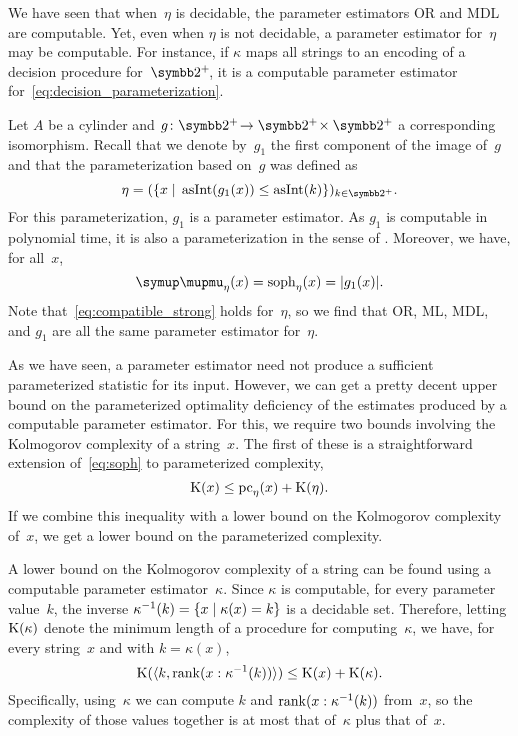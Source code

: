 We have seen that when~$\eta$ is decidable, the parameter estimators OR and MDL are computable.
Yet, even when $\eta$ is not decidable, a parameter estimator for~$\eta$ may be computable.
For instance, if $\kappa$ maps all strings to an encoding of a decision procedure for~$\binary^+\!$, it is a computable parameter estimator for~\eqref{eq:decision_parameterization}.

\begin{example}
\label{ex:p-cylinder:estimator}%
  Let $A$ be a \pdash{}cylinder and $g\colon \binary^+\! \to \binary^+\! \times \binary^+$ a corresponding isomorphism.
  Recall that we denote by~$g_1$ the first component of the image of~$g$ and that the parameterization based on~$g$ was defined as
  \begin{equation*}
    \eta \deq (\{x \st \asNat(g_1(x)) \le \asNat(k)\})_{k \in \binary^+}.
  \end{equation*}
  For this parameterization, $g_1$ is a parameter estimator.
  As $g_1$ is computable in polynomial time, it is also a parameterization in the sense of \citeauthor{flum2006parameterized}.
  Moreover, we have, for all~$x$,
  \begin{equation*}
    \mu_\eta(x) = \soph_\eta(x) = \length{g_1(x)}.
  \end{equation*}
  Note that~\eqref{eq:compatible_strong} holds for~$\eta$, so we find that OR, ML, MDL, and $g_1$ are all the same parameter estimator for~$\eta$.
\end{example}

As we have seen, a parameter estimator need not produce a sufficient parameterized statistic for its input.
However, we can get a pretty decent upper bound on the parameterized optimality deficiency of the estimates produced by a computable parameter estimator.
For this, we require two bounds involving the Kolmogorov complexity of a string~$x$.
The first of these is a straightforward extension of~\eqref{eq:soph} to parameterized complexity,
\begin{equation}
\label{eq:kclepc}
  \operatorname{K}(x) \le \operatorname{pc}_\eta(x) + \operatorname{K}(\eta).
\end{equation}
If we combine this inequality with a lower bound on the Kolmogorov complexity of~$x$, we get a lower bound on the parameterized complexity.

A lower bound on the Kolmogorov complexity of a string can be found using a computable parameter estimator~$\kappa$.
Since $\kappa$ is computable, for every parameter value~$k$, the inverse $\kappa^{-1}(k) = \{x \;|\; \kappa(x) = k\}$ is a decidable set.
Therefore, letting $\operatorname{K}(\kappa)$ denote the minimum length of a procedure for computing~$\kappa$, we have, for every string~$x$ and with $k = \kappa(x)$,
\begin{equation}
\label{eq:kclowerbound}
  \operatorname{K}({\langle k, \operatorname{rank}(x : \kappa^{-1}(k))\rangle}) \le \operatorname{K}(x) + \operatorname{K}(\kappa).
\end{equation}
Specifically, using~$\kappa$ we can compute $k$ and $\operatorname{rank}(x : \kappa^{-1}(k))$ from~$x$, so the complexity of those values together is at most that of~$\kappa$ plus that of~$x$.


